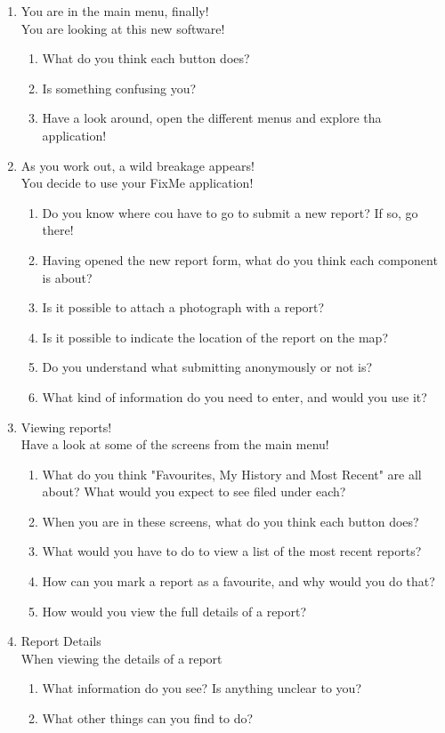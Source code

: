 \documentclass[12pt]{article}
\begin{document}
\begin{enumerate}
\item You are in the main menu, finally!\\
You are looking at this new software!
\begin{enumerate}
\item What do you think each button does?
\item Is something confusing you?
\item Have a look around, open the different menus and explore tha application!
\end{enumerate}

\item As you work out, a wild breakage appears!\\
You decide to use your FixMe application!
\begin{enumerate}
\item Do you know where cou have to go to submit a new report? If so, go there!
\item Having opened the new report form, what do you think each component is about?
\item Is it possible to attach a photograph with a report?
\item Is it possible to indicate the location of the report on the map?
\item Do you understand what submitting anonymously or not is?
\item What kind of information do you need to enter, and would you use it?
\end{enumerate}

\item Viewing reports!\\
Have a look at some of the screens from the main menu!
\begin{enumerate}
\item What do you think "Favourites, My History and Most Recent" are all about? What would you expect to see filed under each?
\item When you are in these screens, what do you think each button does?
\item What would you have to do to view a list of the most recent reports?
\item How can you mark a report as a favourite, and why would you do that?
\item How would you view the full details of a report?
\end{enumerate}

\item Report Details\\
When viewing the details of a report
\begin{enumerate}
\item What information do you see? Is anything unclear to you?
\item What other things can you find to do?
\end{enumerate}


\end{enumerate}
\end{document}
